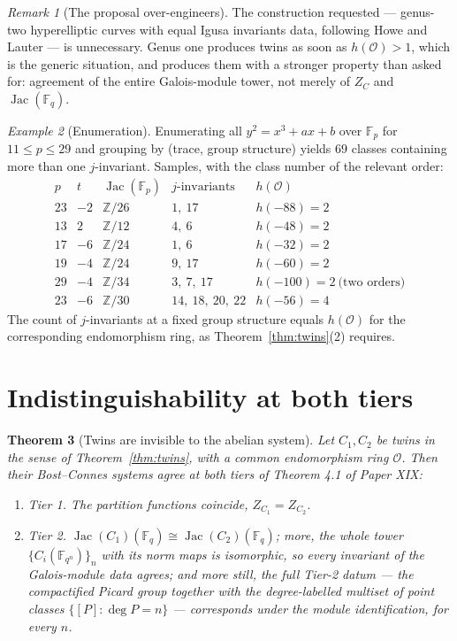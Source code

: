 \documentclass[11pt]{amsart}
\numberwithin{equation}{section}
\newtheorem{theorem}{Theorem}[section]
\theoremstyle{definition}
\theoremstyle{remark}
\newtheorem{remark}[theorem]{Remark}
\newtheorem{example}[theorem]{Example}
\newcommand{\Z}{\mathbb{Z}}
\newcommand{\F}{\mathbb{F}}
\newcommand{\cO}{\mathcal{O}}
\newcommand{\Jac}{\operatorname{Jac}}
\begin{document}
\begin{remark}[The proposal over-engineers]\label{rem:overengineer}
The construction requested --- genus-two hyperelliptic curves with equal Igusa invariants
data, following Howe \cite{Howe} and Lauter \cite{Lauter} --- is unnecessary. Genus one produces twins as soon as
$h(\cO)>1$, which is the generic situation, and produces them with a stronger property than
asked for: agreement of the entire Galois-module tower, not merely of $Z_C$ and
$\Jac(\F_q)$.
\end{remark}

\begin{example}[Enumeration]\label{ex:enum}
Enumerating all $y^2=x^3+ax+b$ over $\F_p$ for $11\le p\le29$ and grouping by (trace, group
structure) yields $69$ classes containing more than one $j$-invariant. Samples, with the
class number of the relevant order:
\[
\begin{array}{lllll}
p & t & \Jac(\F_p) & j\text{-invariants} & h(\cO)\\\hline
23 & -2 & \Z/26 & 1,\ 17 & h(-88)=2\\
13 & 2 & \Z/12 & 4,\ 6 & h(-48)=2\\
17 & -6 & \Z/24 & 1,\ 6 & h(-32)=2\\
19 & -4 & \Z/24 & 9,\ 17 & h(-60)=2\\
29 & -4 & \Z/34 & 3,\ 7,\ 17 & h(-100)=2\ \text{(two orders)}\\
23 & -6 & \Z/30 & 14,\ 18,\ 20,\ 22 & h(-56)=4
\end{array}
\]
The count of $j$-invariants at a fixed group structure equals $h(\cO)$ for the corresponding
endomorphism ring, as Theorem~\ref{thm:twins}(2) requires.
\end{example}

\section{Indistinguishability at both tiers}

\begin{theorem}[Twins are invisible to the abelian system]\label{thm:invisible}
Let $C_1,C_2$ be twins in the sense of Theorem~\ref{thm:twins}, with a common endomorphism
ring $\cO$. Then their Bost--Connes systems agree at both tiers of Theorem 4.1 of Paper XIX:
\begin{enumerate}
\item \emph{Tier 1.} The partition functions coincide, $Z_{C_1}=Z_{C_2}$.
\item \emph{Tier 2.} $\Jac(C_1)(\F_q)\cong\Jac(C_2)(\F_q)$; more, the whole tower
$\{C_i(\F_{q^n})\}_n$ with its norm maps is isomorphic, so every invariant of the
Galois-module data agrees; and more still, the full Tier-2 datum --- the compactified Picard
group together with the degree-labelled multiset of point classes $\{[P]:\deg P=n\}$ ---
corresponds under the module identification, for every $n$.
\end{enumerate}
\end{theorem}
\end{document}
